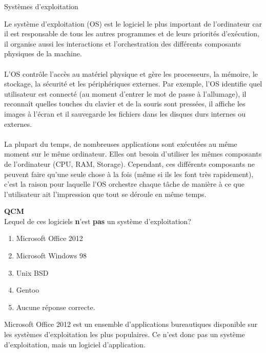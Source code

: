\begin{section}{Systèmes d'exploitation}
    
Le système d'exploitation (OS) est le logiciel le plus important de l'ordinateur car il est responsable de tous les autres programmes et de leurs priorités d'exécution, il organise aussi les interactions et l'orchestration des différents composants physiques de la machine.
\\\\
L'OS contrôle l'accès au matériel physique et gère les processeurs, la mémoire, le stockage, la sécurité et les périphériques externes. Par exemple, l'OS identifie quel utilisateur est connecté (au moment d'entrer le mot de passe à l'allumage), il reconnaît quelles touches du clavier et de la souris sont pressées, il affiche les images à l'écran et il sauvegarde les fichiers dans les disques durs internes ou externes.
\\\\
La plupart du temps, de nombreuses applications sont exécutées au même moment sur le même ordinateur. Elles ont besoin d'utiliser les mêmes composants de l'ordinateur (CPU, RAM, Storage). Cependant, ces différents composants ne peuvent faire qu'une seule chose à la fois (même si ils les font très rapidement), c'est la raison pour laquelle l'OS orchestre chaque tâche de manière à ce que l'utilisateur ait l'impression que tout se déroule en même temps.
\\

    \begin{Exercice}[2 minutes]  \textbf{QCM}\\
    Lequel de ces logiciels \textbf{n}'est \textbf{pas} un système d'exploitation?
        \begin{enumerate}
            \item Microsoft Office 2012
            \item Microsoft Windows 98
            \item Unix BSD
            \item Gentoo
            \item Aucune réponse correcte.
        \end{enumerate}
    \end{Exercice}
    \begin{solution}
                Microsoft Office 2012 est un ensemble d'applications bureautiques disponible sur les systèmes d'exploitation les plus populaires.
		Ce n'est donc pas un système d'exploitation, mais un logiciel d'application. 
    \end{solution}


\end{section}

